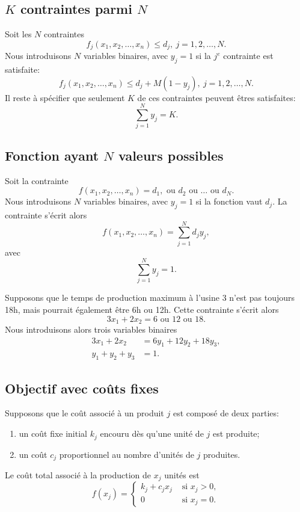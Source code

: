 \subsection{$K$ contraintes parmi $N$}

Soit les $N$ contraintes
\[
f_j(x_1,x_2,\ldots,x_n) \leq d_j,\ j = 1,2,\ldots,N.
\]
Nous introduisons $N$ variables binaires, avec $y_j = 1$ si la $j^e$ contrainte est satisfaite:
\[
f_j(x_1,x_2,\ldots,x_n) \leq d_j + M(1-y_j),\ j = 1,2,\ldots,N.
\]
Il reste à spécifier que seulement $K$ de ces contraintes peuvent êtres satisfaites:
\[
\sum_{j = 1}^N y_j = K.
\]

\subsection{Fonction ayant $N$ valeurs possibles}

Soit la contrainte
\[
f(x_1,x_2,\ldots,x_n) = d_1,\mbox{ ou }d_2\mbox{ ou }\ldots\mbox{ ou }d_N.
\]
Nous introduisons $N$ variables binaires, avec $y_j = 1$ si la fonction vaut $d_j$.
La contrainte s'écrit alors
\[
f(x_1,x_2,\ldots,x_n) = \sum_{j=1}^N d_j y_j,
\]
avec
\[
\sum_{j = 1}^N y_j = 1.
\]

\begin{example}
Supposons que le temps de production maximum à l'usine 3 n'est pas toujours 18h, mais pourrait également être 6h ou 12h.
Cette contrainte s'écrit alors
\[
3x_1 + 2x_2 = 6\mbox{ ou }12\mbox{ ou }18.
\]
Nous introduisons alors trois variables binaires
\begin{align*}
3x_1 + 2x_2 &= 6y_1 + 12y_2 + 18y_3,\\
y_1 + y_2 + y_3 &= 1.
\end{align*}
\end{example}

\subsection{Objectif avec coûts fixes}

Supposons que le coût associé à un produit $j$ est composé de deux parties:
\begin{enumerate}
\item
un coût fixe initial $k_j$ encouru dès qu'une unité de $j$ est produite;
\item
un coût $c_j$ proportionnel au nombre d'unités de $j$ produites.
\end{enumerate}
Le coût total associé à la production de $x_j$ unités est
\[
f(x_j) =
\begin{cases}
k_j + c_j x_j & \mbox{ si } x_j > 0,\\
0 & \mbox{ si } x_j = 0.
\end{cases}
\]

